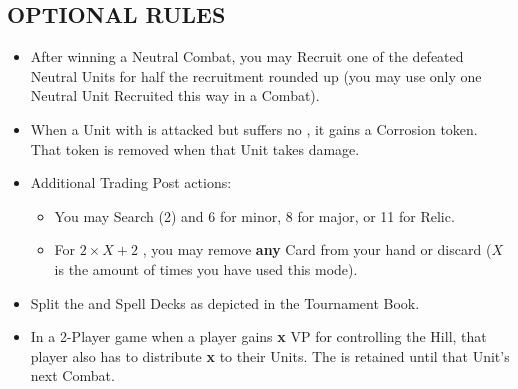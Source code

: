 \begin{multicols}{2}
\subsection*{\MakeUppercase{Optional Rules}}
\begin{itemize}
  \item After winning a Neutral Combat, you may Recruit one of the defeated Neutral Units for half the recruitment  rounded up (you may use only one Neutral Unit Recruited this way in a Combat).  %
  \item When a Unit with  is attacked but suffers no , it gains a Corrosion token. That token is removed when that Unit takes damage.
  \item Additional Trading Post actions:
  \begin{itemize}
    \item You may Search (2)  and  6  for minor, 8  for major, or 11  for Relic.
    \item For $2×X+2$ , you may remove \textbf{any} Card from your hand or discard ($X$is the amount of times you have used this mode).
  \end{itemize}
  \item Split the  and Spell Decks as depicted in the Tournament Book.
  \item In a 2-Player game when a player gains \textbf{x} VP for controlling the Hill, that player also has to distribute \textbf{x}  to their Units. The  is retained until that Unit's next Combat.
\end{itemize}

\end{multicols}

